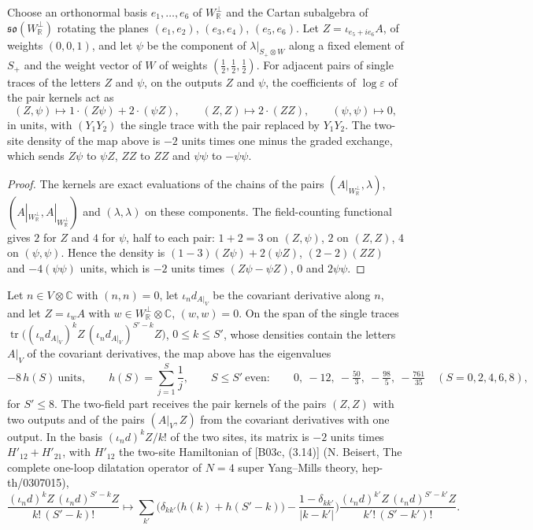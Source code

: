 \begin{proposition}
\label{prop:c10-su11}
Choose an orthonormal basis $e_1,\dots,e_6$ of $W_{\mathbb R}^\perp$ and the Cartan subalgebra of $\mathfrak{so}(W_{\mathbb R}^\perp)$ rotating the planes $(e_1,e_2)$, $(e_3,e_4)$, $(e_5,e_6)$. Let $Z=\iota_{e_5+ie_6}A$, of weights $(0,0,1)$, and let $\psi$ be the component of $\lambda|_{S_+\otimes W}$ along a fixed element of $S_+$ and the weight vector of $W$ of weights $(\tfrac12,\tfrac12,\tfrac12)$. For adjacent pairs of single traces of the letters $Z$ and $\psi$, on the outputs $Z$ and $\psi$, the coefficients of $\log\varepsilon$ of the pair kernels act as
\[
(Z,\psi)\mapsto1\cdot(Z\psi)+2\cdot(\psi Z),\qquad (Z,Z)\mapsto2\cdot(ZZ),\qquad (\psi,\psi)\mapsto0,
\]
in units, with $(Y_1Y_2)$ the single trace with the pair replaced by $Y_1Y_2$. The two-site density of the map above is $-2$ units times one minus the graded exchange, which sends $Z\psi$ to $\psi Z$, $ZZ$ to $ZZ$ and $\psi\psi$ to $-\psi\psi$.
\end{proposition}

\begin{proof}
The kernels are exact evaluations of the chains of the pairs $(A|_{W_{\mathbb R}^\perp},\lambda)$, $(A|_{W_{\mathbb R}^\perp},A|_{W_{\mathbb R}^\perp})$ and $(\lambda,\lambda)$ on these components. The field-counting functional gives $2$ for $Z$ and $4$ for $\psi$, half to each pair: $1+2=3$ on $(Z,\psi)$, $2$ on $(Z,Z)$, $4$ on $(\psi,\psi)$. Hence the density is $(1-3)(Z\psi)+2(\psi Z)$, $(2-2)(ZZ)$ and $-4(\psi\psi)$ units, which is $-2$ units times $(Z\psi-\psi Z)$, $0$ and $2\psi\psi$.
\end{proof}

\begin{proposition}
\label{prop:c10-twist}
Let $n\in V\otimes\mathbb C$ with $(n,n)=0$, let $\iota_nd_{A|_V}$ be the covariant derivative along $n$, and let $Z=\iota_wA$ with $w\in W_{\mathbb R}^\perp\otimes\mathbb C$, $(w,w)=0$. On the span of the single traces $\operatorname{tr}\big((\iota_nd_{A|_V})^kZ\,(\iota_nd_{A|_V})^{S'-k}Z\big)$, $0\le k\le S'$, whose densities contain the letters $A|_V$ of the covariant derivatives, the map above has the eigenvalues
\[
-8\,h(S)\ \text{units},\qquad h(S)=\sum_{j=1}^S\frac1j,\qquad S\le S'\ \text{even}:\qquad 0,\ -12,\ -\tfrac{50}3,\ -\tfrac{98}5,\ -\tfrac{761}{35}\quad(S=0,2,4,6,8),
\]
for $S'\le8$. The two-field part receives the pair kernels of the pairs $(Z,Z)$ with two outputs and of the pairs $(A|_V,Z)$ from the covariant derivatives with one output. In the basis $(\iota_nd)^kZ/k!$ of the two sites, its matrix is $-2$ units times $H'_{12}+H'_{21}$, with $H'_{12}$ the two-site Hamiltonian of [B03c, (3.14)] (N. Beisert, The complete one-loop dilatation operator of $N=4$ super Yang--Mills theory, hep-th/0307015),
\[
\frac{(\iota_nd)^kZ\,(\iota_nd)^{S'-k}Z}{k!\,(S'-k)!}\longmapsto\sum_{k'}\Big(\delta_{kk'}\big(h(k)+h(S'-k)\big)-\frac{1-\delta_{kk'}}{|k-k'|}\Big)\frac{(\iota_nd)^{k'}Z\,(\iota_nd)^{S'-k'}Z}{k'!\,(S'-k')!}.
\]
\end{proposition}

